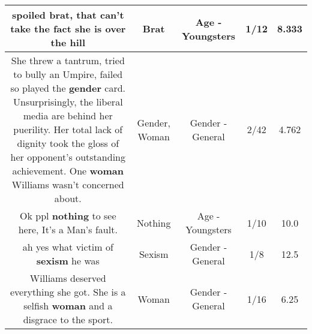 \documentclass[11pt]{article}
\newlength\mylength
\begin{document}
\begin{center}
\begin{longtable}{|C{.65\mylength}|C{.30\mylength}|C{.12\mylength}|C{.12\mylength}|C{.12\mylength}|}
  \small spoiled \textbf{brat}, that can't take the fact she is over the hill\normalsize   & Brat & Age - Youngsters & 1/12 & 8.333 \\  \hline
  \small She threw a tantrum, tried to bully an Umpire, failed so played the \textbf{gender} card. Unsurprisingly, the liberal media are behind her puerility. Her total lack of dignity took the gloss of her opponent's outstanding achievement. One \textbf{woman} Williams wasn't concerned about.\normalsize   & Gender, Woman & Gender - General & 2/42 & 4.762 \\  \hline
  \small Ok ppl \textbf{nothing} to see here, It's a Man's fault.\normalsize   & Nothing & Age - Youngsters & 1/10 & 10.0 \\  \hline
  \small ah yes what victim of \textbf{sexism} he was\normalsize   & Sexism & Gender - General & 1/8 & 12.5 \\  \hline
  \small Williams deserved everything she got. She is a selfish \textbf{woman} and a disgrace to the sport.\normalsize   & Woman & Gender - General & 1/16 & 6.25 \\  \hline

\end{longtable}
\end{center}
\end{document}
